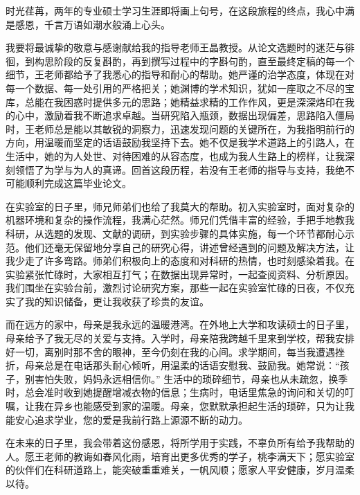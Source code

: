 \begin{acknowledge}%
时光荏苒，两年的专业硕士学习生涯即将画上句号，在这段旅程的终点，我心中满是感恩，千言万语如潮水般涌上心头。

我要将最诚挚的敬意与感谢献给我的指导老师王晶教授。从论文选题时的迷茫与徘徊，到构思阶段的反复斟酌，再到撰写过程中的字斟句酌，直至最终定稿的每一个细节，王老师都给予了我悉心的指导和耐心的帮助。她严谨的治学态度，体现在对每一个数据、每一处引用的严格把关；她渊博的学术知识，犹如一座取之不尽的宝库，总能在我困惑时提供多元的思路；她精益求精的工作作风，更是深深烙印在我的心中，激励着我不断追求卓越。当研究陷入瓶颈，数据出现偏差，思路陷入僵局时，王老师总是能以其敏锐的洞察力，迅速发现问题的关键所在，为我指明前行的方向，用温暖而坚定的话语鼓励我坚持下去。她不仅是我学术道路上的引路人，在生活中，她的为人处世、对待困难的从容态度，也成为我人生路上的榜样，让我深刻领悟了为学与为人的真谛。回首这段历程，若没有王老师的指导与支持，我绝不可能顺利完成这篇毕业论文。

在实验室的日子里，师兄师弟们也给了我莫大的帮助。初入实验室时，面对复杂的机器环境和复杂的操作流程，我满心茫然。师兄们凭借丰富的经验，手把手地教我科研，从选题的发现、文献的调研，到实验步骤的具体实施，每一个环节都耐心示范。他们还毫无保留地分享自己的研究心得，讲述曾经遇到的问题及解决方法，让我少走了许多弯路。师弟们积极向上的态度和对科研的热情，也时刻感染着我。在实验紧张忙碌时，大家相互打气；在数据出现异常时，一起查阅资料、分析原因。我们围坐在实验台前，激烈讨论研究方案，那些一起在实验室忙碌的日夜，不仅充实了我的知识储备，更让我收获了珍贵的友谊。

而在远方的家中，母亲是我永远的温暖港湾。在外地上大学和攻读硕士的日子里，母亲给予了我无尽的关爱与支持。入学时，母亲陪我跨越千里来到学校，帮我安排好一切，离别时那不舍的眼神，至今仍刻在我的心间。求学期间，每当我遭遇挫折，母亲总是在电话那头耐心倾听，用温柔的话语安慰我、鼓励我。她常说：“孩子，别害怕失败，妈妈永远相信你。” 生活中的琐碎细节，母亲也从未疏忽，换季时，总会准时收到她提醒增减衣物的信息；生病时，电话里焦急的询问和关切的叮嘱，让我在异乡也能感受到家的温暖。母亲，您默默承担起生活的琐碎，只为让我能安心追求学业，您的爱是我前行路上源源不断的动力。

在未来的日子里，我会带着这份感恩，将所学用于实践，不辜负所有给予我帮助的人。愿王老师的教诲如春风化雨，培育出更多优秀的学子，桃李满天下；愿实验室的伙伴们在科研道路上，能突破重重难关，一帆风顺；愿家人平安健康，岁月温柔以待。
    
\end{acknowledge}